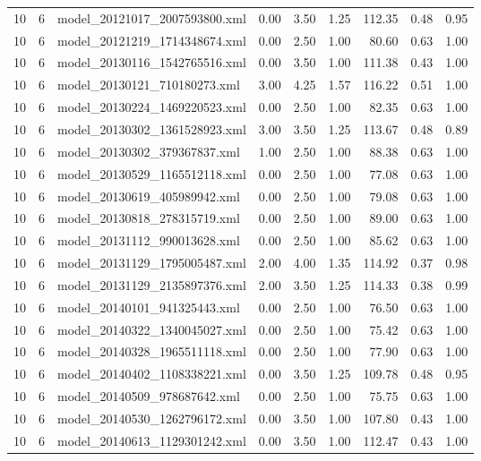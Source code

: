 \begin{table}[ht]
\begin{tabular}{rrlrrrrrr}
   10 &   6 & model\_20121017\_2007593800.xml & 0.00 & 3.50 & 1.25 & 112.35 & 0.48 & 0.95 \\ 
   10 &   6 & model\_20121219\_1714348674.xml & 0.00 & 2.50 & 1.00 & 80.60 & 0.63 & 1.00 \\ 
   10 &   6 & model\_20130116\_1542765516.xml & 0.00 & 3.50 & 1.00 & 111.38 & 0.43 & 1.00 \\ 
   10 &   6 & model\_20130121\_710180273.xml & 3.00 & 4.25 & 1.57 & 116.22 & 0.51 & 1.00 \\ 
   10 &   6 & model\_20130224\_1469220523.xml & 0.00 & 2.50 & 1.00 & 82.35 & 0.63 & 1.00 \\ 
   10 &   6 & model\_20130302\_1361528923.xml & 3.00 & 3.50 & 1.25 & 113.67 & 0.48 & 0.89 \\ 
   10 &   6 & model\_20130302\_379367837.xml & 1.00 & 2.50 & 1.00 & 88.38 & 0.63 & 1.00 \\ 
   10 &   6 & model\_20130529\_1165512118.xml & 0.00 & 2.50 & 1.00 & 77.08 & 0.63 & 1.00 \\ 
   10 &   6 & model\_20130619\_405989942.xml & 0.00 & 2.50 & 1.00 & 79.08 & 0.63 & 1.00 \\ 
   10 &   6 & model\_20130818\_278315719.xml & 0.00 & 2.50 & 1.00 & 89.00 & 0.63 & 1.00 \\ 
   10 &   6 & model\_20131112\_990013628.xml & 0.00 & 2.50 & 1.00 & 85.62 & 0.63 & 1.00 \\ 
   10 &   6 & model\_20131129\_1795005487.xml & 2.00 & 4.00 & 1.35 & 114.92 & 0.37 & 0.98 \\ 
   10 &   6 & model\_20131129\_2135897376.xml & 2.00 & 3.50 & 1.25 & 114.33 & 0.38 & 0.99 \\ 
   10 &   6 & model\_20140101\_941325443.xml & 0.00 & 2.50 & 1.00 & 76.50 & 0.63 & 1.00 \\ 
   10 &   6 & model\_20140322\_1340045027.xml & 0.00 & 2.50 & 1.00 & 75.42 & 0.63 & 1.00 \\ 
   10 &   6 & model\_20140328\_1965511118.xml & 0.00 & 2.50 & 1.00 & 77.90 & 0.63 & 1.00 \\ 
   10 &   6 & model\_20140402\_1108338221.xml & 0.00 & 3.50 & 1.25 & 109.78 & 0.48 & 0.95 \\ 
   10 &   6 & model\_20140509\_978687642.xml & 0.00 & 2.50 & 1.00 & 75.75 & 0.63 & 1.00 \\ 
   10 &   6 & model\_20140530\_1262796172.xml & 0.00 & 3.50 & 1.00 & 107.80 & 0.43 & 1.00 \\ 
   10 &   6 & model\_20140613\_1129301242.xml & 0.00 & 3.50 & 1.00 & 112.47 & 0.43 & 1.00 \\ 

\end{tabular}
\end{table}
